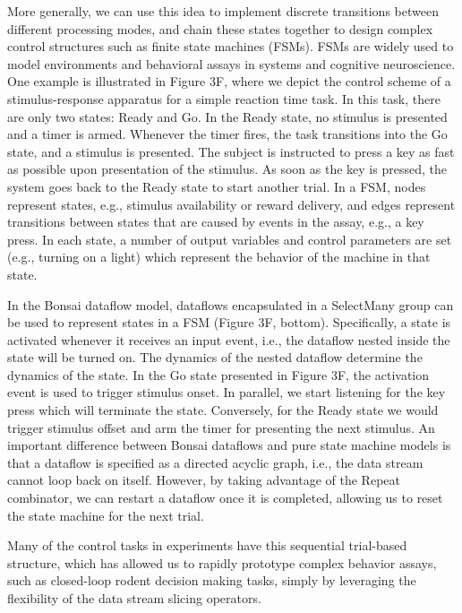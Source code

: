 More generally, we can use this idea to implement discrete transitions between different processing modes, and chain these states together to design complex control structures such as finite state machines (FSMs). FSMs are widely used to model environments and behavioral assays in systems and cognitive neuroscience. One example is illustrated in Figure 3F, where we depict the control scheme of a stimulus-response apparatus for a simple reaction time task. In this task, there are only two states: Ready and Go. In the Ready state, no stimulus is presented and a timer is armed. Whenever the timer fires, the task transitions into the Go state, and a stimulus is presented. The subject is instructed to press a key as fast as possible upon presentation of the stimulus. As soon as the key is pressed, the system goes back to the Ready state to start another trial. In a FSM, nodes represent states, e.g., stimulus availability or reward delivery, and edges represent transitions between states that are caused by events in the assay, e.g., a key press. In each state, a number of output variables and control parameters are set (e.g., turning on a light) which represent the behavior of the machine in that state.

In the Bonsai dataflow model, dataflows encapsulated in a SelectMany group can be used to represent states in a FSM (Figure 3F, bottom). Specifically, a state is activated whenever it receives an input event, i.e., the dataflow nested inside the state will be turned on. The dynamics of the nested dataflow determine the dynamics of the state. In the Go state presented in Figure 3F, the activation event is used to trigger stimulus onset. In parallel, we start listening for the key press which will terminate the state. Conversely, for the Ready state we would trigger stimulus offset and arm the timer for presenting the next stimulus. An important difference between Bonsai dataflows and pure state machine models is that a dataflow is specified as a directed acyclic graph, i.e., the data stream cannot loop back on itself. However, by taking advantage of the Repeat combinator, we can restart a dataflow once it is completed, allowing us to reset the state machine for the next trial.

Many of the control tasks in experiments have this sequential trial-based structure, which has allowed us to rapidly prototype complex behavior assays, such as closed-loop rodent decision making tasks, simply by leveraging the flexibility of the data stream slicing operators.

